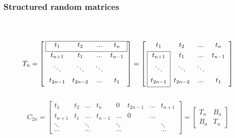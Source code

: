 \begin{frame}[t]
	\frametitle{Structured random matrices}
	\framesubtitle{~~}  %
	$$
	T_{n} = \left[ \: 
		\begin{array}{*{4}{c}}
			\cline{1-4}
			\multicolumn{1}{|c}{t_{1}} & t_{2} & ...& \multicolumn{1}{c|}{t_{n}}           \\[0.3em]
			\cline{1-4}
			t_{n+1} & t_{1} & ... & t_{n-1} \\[0.3em]
			\ddots &\ddots & \ddots &    \\[0.3em]
			t_{2n-1} & t_{2n-2} & ... & t_{1}      \\[0.3em]    
		\end{array}
	\right]
	=
	\left[ \:
		\begin{array}{*{4}{c}}
			t_{1} & t_{2} & ...& t_{n}        \\[0.3em]
			\cline{1-1}
			\multicolumn{1}{|c|}{t_{n+1}} & t_{1} & ... & t_{n-1} \\[0.3em]
			\multicolumn{1}{|c|}{\ddots} & \ddots & \ddots &    \\[0.3em]
			\multicolumn{1}{|c|}{t_{2n-1}} & t_{2n-2} & ... & t_{1}          \\[0.3em]
			\cline{1-1}
		\end{array}
	\right]
	$$
	\\
	$$
	C_{2n} =\begin{bmatrix}
		t_{1}   & t_{2} & ...    & t_{n}  & 0   & t_{2n-1} & ... &  t_{n+1}   \\[0.3em]
		t_{n+1} & t_{1} & ...    & t_{n-1}& ... & 0  & ... &          \\[0.3em]
		\ddots  &       & \ddots &        & \ddots & & &\ddots    \\[0.3em]
		\cdots  &       & \cdots &       & \cdots & & & \cdots
	\end{bmatrix}
	=
	\begin{bmatrix}
		T_{n} & B_{n}            \\[0.3em]
		B_{n} & T_{n}   
	\end{bmatrix}
	$$

\end{frame}

